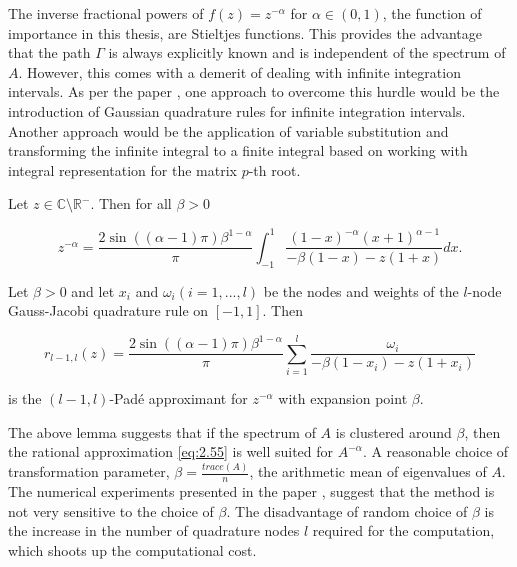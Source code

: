 The inverse fractional powers of $f(z) = z^{-\alpha}$ for $\alpha \in(0,1)$, the function of importance in this thesis, are Stieltjes functions. This provides the advantage that the path $\Gamma$ is always explicitly known and is independent of the spectrum of $A$. However, this comes with a demerit of dealing with infinite integration intervals. As per the paper \cite{57}, one approach to overcome this hurdle would be the introduction of Gaussian quadrature rules for infinite integration intervals. Another approach would be the application of variable substitution and transforming the infinite integral to a finite integral based on \cite{58} working with integral representation for the matrix $p$-th root.

\begin{lemma}
    \label{rem:2.20}
    \cite{52}Let $z \in \mathbb{C} \setminus \mathbb{R}^{-}$. Then for all $\beta > 0$

    \begin{equation}
        z^{-\alpha} = \frac{2 \sin((\alpha-1)\pi) \beta^{1-\alpha}}{\pi} \int_{-1}^{1} \frac{(1-x)^{-\alpha}(x+1)^{\alpha-1}}{-\beta(1-x) - z(1+x)}dx.
        \label{eq:2.54}
    \end{equation}
\end{lemma}

\begin{lemma}
    \label{rem:2.21}
    \cite{52}Let $\beta > 0$ and let $x_{i}$ and $\omega_{i} (i=1,...,l)$ be the nodes and weights of the $l$-node Gauss-Jacobi quadrature rule on $[-1,1]$. Then

    \begin{equation}
        r_{l-1,l}(z) = \frac{2 \sin((\alpha-1)\pi) \beta^{1-\alpha}}{\pi} \sum_{i=1}^{l} \frac{\omega_{i}}{-\beta(1-x_{i}) - z(1+x_{i})}
        \label{eq:2.55}
    \end{equation}

    is the $(l-1,l)$-Padé approximant for $z^{-\alpha}$ with expansion point $\beta$.
\end{lemma}

The above lemma suggests that if the spectrum of $A$ is clustered around $\beta$, then the rational approximation \eqref{eq:2.55} is well suited for $A^{-\alpha}$. A reasonable choice of transformation parameter, $\beta = \frac{trace(A)}{n}$, the arithmetic mean of eigenvalues of $A$. The numerical experiments presented in the paper \cite{52}, suggest that the method is not very sensitive to the choice of $\beta$. The disadvantage of random choice of $\beta$ is the increase in the number of quadrature nodes $l$ required for the computation, which shoots up the computational cost.

